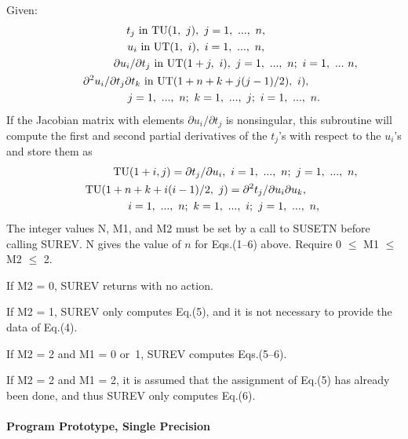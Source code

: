 \documentclass[twoside]{MATH77}
\begin{document}
Given:
\begin{gather}
\hspace{-15pt}t_j \text{ in TU}(1,\ j),\ j = 1,\ ...,\ n,\\
\hspace{-15pt}u_i \text{ in UT}(1,\ i),\ i = 1,\ ...,\ n,\\
\hspace{-15pt}\partial u_i/\partial t_j\text{ in UT}(1+j,\ i),\ j = 1,\
...,\ n;\ i = 1,\ ...\ n,\hspace{-1in}\\
\hspace{-15pt}\partial ^2u_i/\partial t_j\partial t_k \text{ in UT}
(1+n+k+j(j-1)/2),\ i),\\
\hspace{.5in}j= 1,\ ...,\ n;\ k = 1,\ ...,\ j;\ i = 1,\ ...,\ n.
\notag
\end{gather}
If the Jacobian matrix with elements $\partial u_i/\partial t_j$ is
nonsingular, this subroutine will compute the first and second partial
derivatives of the $t_j$'s with respect to the $u_i$'s and
store them as
\begin{gather}
\hspace{-15pt}\text{TU}(1+i, j) = \partial t_j/\partial u_i,\ i =
1,\ ...,\ n;\ j = 1,\ ...,\ n,\hspace{-1in}\\
\hspace{-15pt}\text{TU}(1+n+k+i(i-1)/2,\ j) = \partial ^2t_j/\partial
u_i\partial u_k,\\
\hspace{.5in}i =1,\ ...,\ n;\ k = 1,\ ...,\ i;\ j = 1,\ ...,\ n,\notag
\end{gather}
The integer values N, M1, and M2 must be set by a call to SUSETN
before calling SUREV.  N gives
the value of $n$ for Eqs.(1--6) above.
Require 0 $\leq $ M1 $\leq $ M2 $\leq $ 2.

If M2 = 0, SUREV returns with no action.

If M2 = 1, SUREV only computes Eq.(5), and it is not necessary to provide
the data of Eq.(4).

If M2 = 2 and M1 = 0 or~1, SUREV computes Eqs.(5--6).

If M2 = 2 and M1 = 2, it is assumed that the assignment of Eq.(5) has
already been done, and thus SUREV only computes Eq.(6).

\paragraph{Program Prototype, Single Precision}
\end{document}
